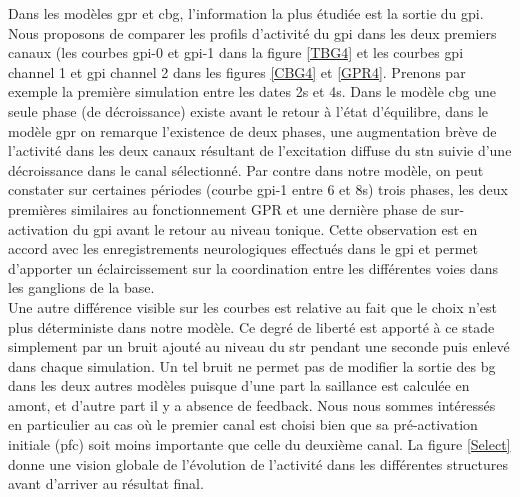 Dans les modèles \gls{gpr} et \gls{cbg}, l'information la plus étudiée est la sortie du \gls{gpi}. Nous proposons de comparer les profils d'activité du \gls{gpi} dans les deux premiers canaux (les courbes \gls{gpi}-0 et \gls{gpi}-1 dans la figure \ref{TBG4} et les courbes \gls{gpi} channel 1 et \gls{gpi} channel 2 dans les figures \ref{CBG4} et \ref{GPR4}. Prenons par exemple la première simulation entre les dates 2s et 4s. Dans le modèle \gls{cbg} une seule phase (de décroissance) existe avant le retour à l'état d'équilibre, dans le modèle \gls{gpr} on remarque l'existence de deux phases, une augmentation brève de l'activité dans les deux canaux résultant de l'excitation diffuse du \gls{stn} suivie d'une décroissance dans le canal sélectionné. Par contre dans notre modèle, on peut constater sur certaines périodes (courbe \gls{gpi}-1 entre 6 et 8s) trois phases, les deux premières similaires au fonctionnement GPR et une dernière phase de sur-activation du \gls{gpi} avant le retour au niveau tonique. Cette observation est en accord avec les enregistrements neurologiques effectués dans le \gls{gpi} \cite{Nambu:2000} et permet d'apporter un éclaircissement sur la coordination entre les différentes voies dans les ganglions de la base.\\

Une autre différence visible sur les courbes est relative au fait que le choix n'est plus déterministe dans notre modèle. Ce degré de liberté est apporté à ce stade simplement par un bruit ajouté au niveau du \gls{str} pendant une seconde puis enlevé dans chaque simulation. Un tel bruit ne permet pas de modifier la sortie des \gls{bg} dans les deux autres modèles puisque d'une part la saillance est calculée en amont, et d'autre part il y a absence de feedback. Nous nous sommes intéressés en particulier au cas o\`u le premier canal est choisi bien que sa pré-activation initiale (\gls{pfc}) soit moins importante que celle du deuxième canal. La figure \ref{Select} donne une vision globale de l'évolution de l'activité dans les différentes structures avant d'arriver au résultat final.

